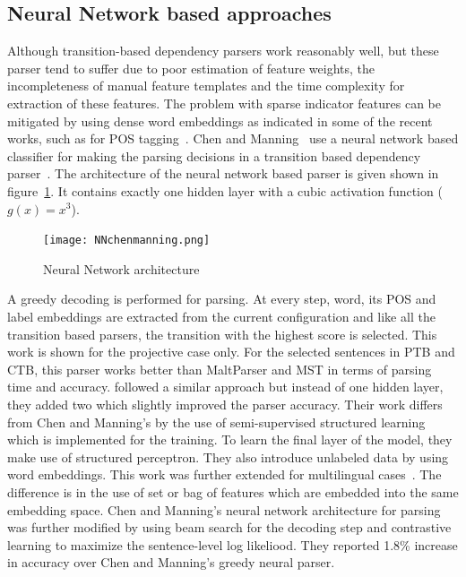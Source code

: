 \subsection{Neural Network based approaches}

Although transition-based dependency parsers work reasonably well, but these parser tend to suffer due to poor estimation of feature weights, the incompleteness of manual feature templates and the time complexity for extraction of these features. The problem with sparse indicator features can be mitigated by using dense word embeddings as indicated in some of the recent works, such as for POS tagging~\cite{collobert2011natural}. Chen and Manning~\cite{chen2014fast} use a neural network based classifier for making the parsing decisions in a transition based dependency parser~\cite{Nivre:2004:DDP:1220355.1220365}. The architecture of the neural network based parser is given shown in figure~\ref{fig:NNchenmanning}. It contains exactly one hidden layer with a cubic  activation function ($g(x) = x^3$).

\begin{figure}[!htb]
    \centering
    \texttt{[image: NNchenmanning.png]}
    \centering
    \caption{Neural Network architecture}
    \label{fig:NNchenmanning}
\end{figure}

A greedy decoding is performed for parsing. At every step, word, its POS and label embeddings are extracted from the current configuration and like all the transition based parsers, the transition with the highest score is selected. This work is shown for the projective case only. For the selected sentences in PTB and CTB, this parser works better than MaltParser and MST in terms of parsing time and accuracy. 
\cite{weiss2015structured} followed a similar approach but instead of one hidden layer, they added two which slightly improved the parser accuracy. Their work differs from Chen and Manning's by the use of semi-supervised structured learning which is implemented for the training. To learn the final layer of the model, they make use of structured perceptron. They also introduce unlabeled data by using word embeddings. This work was further extended for multilingual cases~\cite{alberti2015improved}. The difference is in the use of set or bag of features which are embedded into the same embedding space. 
Chen and Manning's neural network architecture for parsing was further modified by 
\cite{zhou2015neural} using beam search for the decoding step and contrastive learning to maximize the sentence-level log likeliood. They reported 1.8\% increase in accuracy over Chen and Manning's greedy neural parser.

